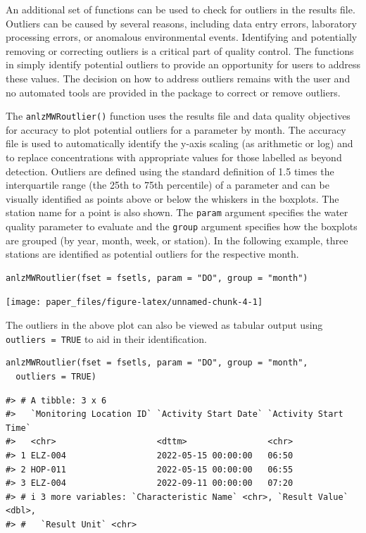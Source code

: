 An additional set of functions can be used to check for outliers in the results file. Outliers can be caused by several reasons, including data entry errors, laboratory processing errors, or anomalous environmental events. Identifying and potentially removing or correcting outliers is a critical part of quality control. The functions in  simply identify potential outliers to provide an opportunity for users to address these values. The decision on how to address outliers remains with the user and no automated tools are provided in the package to correct or remove outliers.

The \texttt{anlzMWRoutlier()} function uses the results file and data quality objectives for accuracy to plot potential outliers for a parameter by month. The accuracy file is used to automatically identify the y-axis scaling (as arithmetic or log) and to replace concentrations with appropriate values for those labelled as beyond detection. Outliers are defined using the standard definition of 1.5 times the interquartile range (the 25th to 75th percentile) of a parameter and can be visually identified as points above or below the whiskers in the boxplots. The station name for a point is also shown. The \texttt{param} argument specifies the water quality parameter to evaluate and the \texttt{group} argument specifies how the boxplots are grouped (by year, month, week, or station). In the following example, three stations are identified as potential outliers for the respective month.

\begin{verbatim}
anlzMWRoutlier(fset = fsetls, param = "DO", group = "month")
\end{verbatim}

\begin{center}\texttt{[image: paper\_files/figure-latex/unnamed-chunk-4-1]} \end{center}

The outliers in the above plot can also be viewed as tabular output using \texttt{outliers\ =\ TRUE} to aid in their identification.

\begin{verbatim}
anlzMWRoutlier(fset = fsetls, param = "DO", group = "month", 
  outliers = TRUE)
\end{verbatim}

\begin{verbatim}
#> # A tibble: 3 x 6
#>   `Monitoring Location ID` `Activity Start Date` `Activity Start Time`
#>   <chr>                    <dttm>                <chr>                
#> 1 ELZ-004                  2022-05-15 00:00:00   06:50                
#> 2 HOP-011                  2022-05-15 00:00:00   06:55                
#> 3 ELZ-004                  2022-09-11 00:00:00   07:20                
#> # i 3 more variables: `Characteristic Name` <chr>, `Result Value` <dbl>,
#> #   `Result Unit` <chr>
\end{verbatim}

